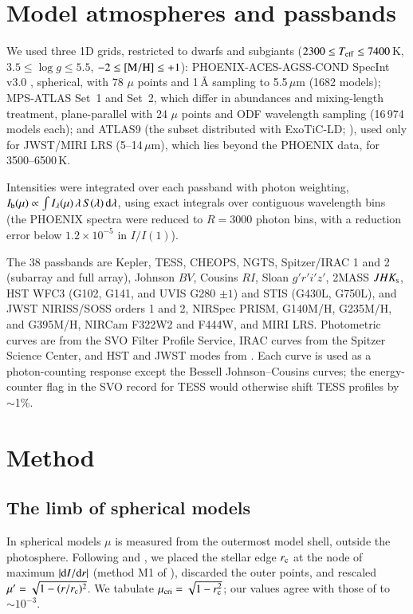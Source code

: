 \documentclass{aa}
\newcommand{\teff}{T_{\rm eff}}
\begin{document}
\section{Model atmospheres and passbands}\label{sec:models}
We used three 1D grids, restricted to dwarfs and subgiants
($2300\le\teff\le7400$\,K, $3.5\le\log g\le5.5$, $-2\le[{\rm M/H}]\le+1$):
PHOENIX-ACES-AGSS-COND SpecInt v3.0 \citep{husser2013}, spherical, with 78
$\mu$ points and 1\,\AA{} sampling to 5.5\,$\mu$m (1682 models); MPS-ATLAS
\citep{witzke2021,kostogryz2022} Set~1 and Set~2, which differ in abundances and
mixing-length treatment, plane-parallel with 24 $\mu$ points and ODF wavelength
sampling (16\,974 models each); and ATLAS9 (the subset distributed with
ExoTiC-LD; \citealt{grant2024}), used only for JWST/MIRI LRS (5--14\,$\mu$m),
which lies beyond the PHOENIX data, for 3500--6500\,K.

Intensities were integrated over each passband with photon weighting,
$I_{\rm b}(\mu)\propto\int I_\lambda(\mu)\,\lambda\,S(\lambda)\,{\rm d}\lambda$,
using exact integrals over contiguous wavelength bins (the PHOENIX spectra were
reduced to $R=3000$ photon bins, with a reduction error below
$1.2\times10^{-5}$ in $I/I(1)$).

The 38 passbands are Kepler, TESS, CHEOPS, NGTS, Spitzer/IRAC 1 and 2 (subarray
and full array), Johnson $BV$, Cousins $RI$, Sloan $g'r'i'z'$, 2MASS
$JHK_{\rm s}$, HST WFC3 (G102, G141, and UVIS G280 $\pm1$) and STIS (G430L,
G750L), and JWST NIRISS/SOSS orders 1 and 2, NIRSpec PRISM, G140M/H, G235M/H,
and G395M/H, NIRCam F322W2 and F444W, and MIRI LRS. Photometric curves are from
the SVO Filter Profile Service, IRAC curves from the Spitzer Science Center, and
HST and JWST modes from \citet{grant2024}. Each curve is used as a
photon-counting response except the Bessell Johnson--Cousins curves; the
energy-counter flag in the SVO record for TESS would otherwise shift TESS
profiles by $\sim$1\%.

\section{Method}\label{sec:method}
\subsection{The limb of spherical models}
In spherical models $\mu$ is measured from the outermost model shell, outside
the photosphere. Following \citet{espinoza2015} and
\citet{claret2017,claretsouthworth2023}, we placed the stellar edge $r_{\rm c}$
at the node of maximum $|{\rm d}I/{\rm d}r|$ (method M1 of
\citealt{claretsouthworth2023}), discarded the outer points, and rescaled
$\mu'=\sqrt{1-(r/r_{\rm c})^2}$. We tabulate $\mu_{\rm cri}=\sqrt{1-r_{\rm c}^2}$;
our values agree with those of \citet{claretsouthworth2023} to $\sim10^{-3}$.
\end{document}

